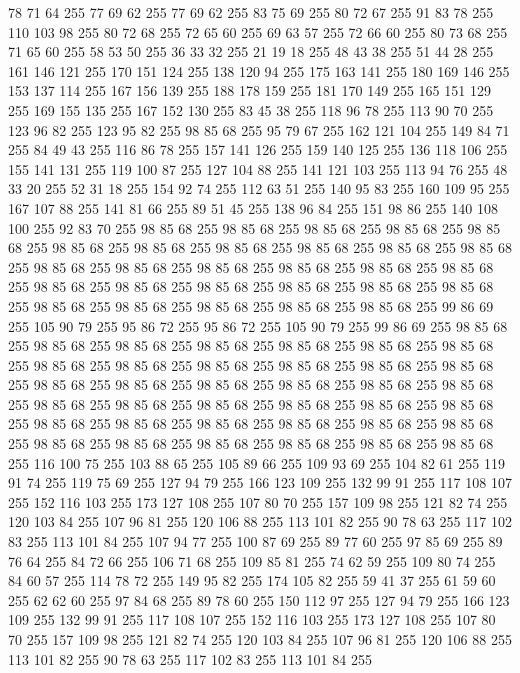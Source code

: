 78 71 64 255 77 69 62 255 77 69 62 255 83 75 69 255 80 72 67 255 91 83 78 255 110 103 98 255 80 72 68 255 72 65 60 255 69 63 57 255 72 66 60 255 80 73 68 255 71 65 60 255 58 53 50 255 36 33 32 255 21 19 18 255 48 43 38 255 51 44 28 255 161 146 121 255 170 151 124 255 138 120 94 255 175 163 141 255 180 169 146 255 153 137 114 255 167 156 139 255 188 178 159 255 181 170 149 255 165 151 129 255 169 155 135 255 167 152 130 255 83 45 38 255 118 96 78 255 113 90 70 255 123 96 82 255 123 95 82 255 98 85 68 255 95 79 67 255 162 121 104 255 149 84 71 255 84 49 43 255 116 86 78 255 157 141 126 255 159 140 125 255 136 118 106 255 155 141 131 255 119 100 87 255 127 104 88 255 141 121 103 255 113 94 76 255 48 33 20 255 52 31 18 255 154 92 74 255 112 63 51 255 140 95 83 255 160 109 95 255 167 107 88 255 141 81 66 255 89 51 45 255 138 96 84 255 151 98 86 255 140 108 100 255 92 83 70 255 98 85 68 255 98 85 68 255
98 85 68 255 98 85 68 255 98 85 68 255 98 85 68 255 98 85 68 255 98 85 68 255 98 85 68 255 98 85 68 255 98 85 68 255 98 85 68 255 98 85 68 255 98 85 68 255 98 85 68 255 98 85 68 255 98 85 68 255 98 85 68 255 98 85 68 255 98 85 68 255 98 85 68 255 98 85 68 255 98 85 68 255 98 85 68 255 98 85 68 255 98 85 68 255 98 85 68 255 98 85 68 255 99 86 69 255 105 90 79 255 95 86 72 255 95 86 72 255 105 90 79 255 99 86 69 255 98 85 68 255 98 85 68 255 98 85 68 255 98 85 68 255 98 85 68 255 98 85 68 255 98 85 68 255 98 85 68 255 98 85 68 255 98 85 68 255 98 85 68 255 98 85 68 255 98 85 68 255 98 85 68 255 98 85 68 255 98 85 68 255 98 85 68 255 98 85 68 255 98 85 68 255 98 85 68 255 98 85 68 255 98 85 68 255 98 85 68 255 98 85 68 255 98 85 68 255 98 85 68 255 98 85 68 255 98 85 68 255 98 85 68 255 98 85 68 255 98 85 68 255 98 85 68 255
98 85 68 255 98 85 68 255 98 85 68 255 98 85 68 255 98 85 68 255 116 100 75 255 103 88 65 255 105 89 66 255 109 93 69 255 104 82 61 255 119 91 74 255 119 75 69 255 127 94 79 255 166 123 109 255 132 99 91 255 117 108 107 255 152 116 103 255 173 127 108 255 107 80 70 255 157 109 98 255 121 82 74 255 120 103 84 255 107 96 81 255 120 106 88 255 113 101 82 255 90 78 63 255 117 102 83 255 113 101 84 255 107 94 77 255 100 87 69 255 89 77 60 255 97 85 69 255 89 76 64 255 84 72 66 255 106 71 68 255 109 85 81 255 74 62 59 255 109 80 74 255 84 60 57 255 114 78 72 255 149 95 82 255 174 105 82 255 59 41 37 255 61 59 60 255 62 62 60 255 97 84 68 255 89 78 60 255 150 112 97 255 127 94 79 255 166 123 109 255 132 99 91 255 117 108 107 255 152 116 103 255 173 127 108 255 107 80 70 255 157 109 98 255 121 82 74 255 120 103 84 255 107 96 81 255 120 106 88 255 113 101 82 255 90 78 63 255 117 102 83 255 113 101 84 255
